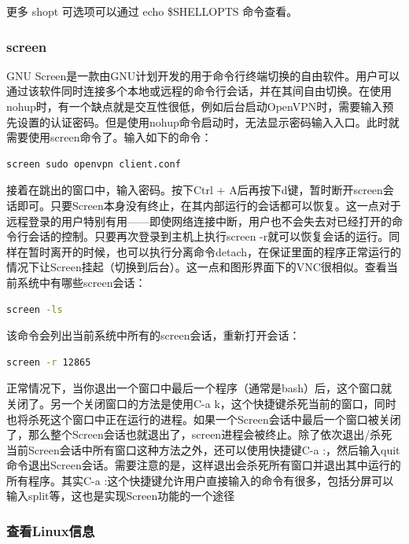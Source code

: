 \documentclass[letter]{book}
\begin{document}
更多 shopt 可选项可以通过 echo \$SHELLOPTS 命令查看。



\subsubsection{screen}

GNU Screen是一款由GNU计划开发的用于命令行终端切换的自由软件。用户可以通过该软件同时连接多个本地或远程的命令行会话，并在其间自由切换。在使用nohup时，有一个缺点就是交互性很低，例如后台启动OpenVPN时，需要输入预先设置的认证密码。但是使用nohup命令启动时，无法显示密码输入入口。此时就需要使用screen命令了。输入如下的命令：

\begin{lstlisting}[language=Bash]
screen sudo openvpn client.conf
\end{lstlisting}

接着在跳出的窗口中，输入密码。按下Ctrl + A后再按下d键，暂时断开screen会话即可。只要Screen本身没有终止，在其内部运行的会话都可以恢复。这一点对于远程登录的用户特别有用——即使网络连接中断，用户也不会失去对已经打开的命令行会话的控制。只要再次登录到主机上执行screen -r就可以恢复会话的运行。同样在暂时离开的时候，也可以执行分离命令detach，在保证里面的程序正常运行的情况下让Screen挂起（切换到后台）。这一点和图形界面下的VNC很相似。查看当前系统中有哪些screen会话：

\begin{lstlisting}[language=Bash]
screen -ls
\end{lstlisting}

该命令会列出当前系统中所有的screen会话，重新打开会话：

\begin{lstlisting}[language=Bash]
screen -r 12865
\end{lstlisting}

正常情况下，当你退出一个窗口中最后一个程序（通常是bash）后，这个窗口就关闭了。另一个关闭窗口的方法是使用C-a k，这个快捷键杀死当前的窗口，同时也将杀死这个窗口中正在运行的进程。如果一个Screen会话中最后一个窗口被关闭了，那么整个Screen会话也就退出了，screen进程会被终止。除了依次退出/杀死当前Screen会话中所有窗口这种方法之外，还可以使用快捷键C-a :，然后输入quit命令退出Screen会话。需要注意的是，这样退出会杀死所有窗口并退出其中运行的所有程序。其实C-a :这个快捷键允许用户直接输入的命令有很多，包括分屏可以输入split等，这也是实现Screen功能的一个途径

\subsubsection{查看Linux信息}
\end{document}
